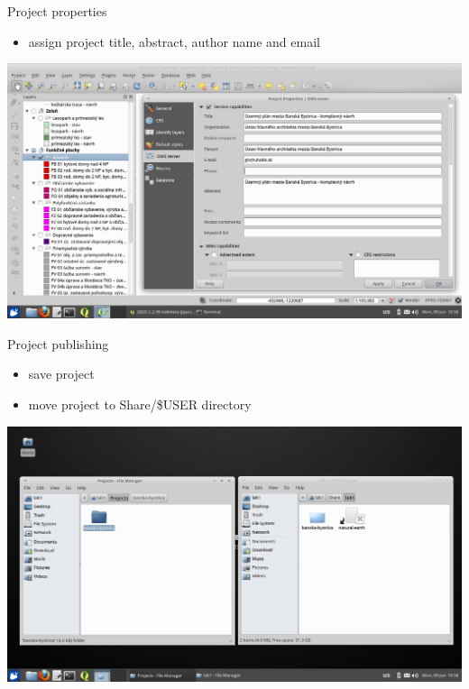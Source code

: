 \documentclass[12pt]{beamer}
\begin{document}
\begin{frame}{Project properties}
	\begin{itemize}
		\item assign project title, abstract, author name and email
	\end{itemize}
	\begin{center}
		\includegraphics[keepaspectratio=true,height=0.6\textheight]{images/real-world-example/project-properties.png}
	\end{center}
\end{frame}


\begin{frame}{Project publishing}
	\begin{itemize}
		\item save project
		\item move project to Share/\$USER directory
	\end{itemize}
	\begin{center}
		\includegraphics[keepaspectratio=true,height=0.6\textheight]{images/real-world-example/project-share-directory.png}
	\end{center}
\end{frame}
\end{document}
